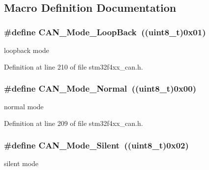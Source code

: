 \subsection{Macro Definition Documentation}
\hypertarget{group___c_a_n__operating__mode_gaad036c944403186eb3496ff65020c0ee}{
\subsubsection[{C\-A\-N\-\_\-\-Mode\-\_\-\-Loop\-Back}]{\setlength{\rightskip}{0pt plus 5cm}\#define C\-A\-N\-\_\-\-Mode\-\_\-\-Loop\-Back~((uint8\-\_\-t)0x01)}}\label{group___c_a_n__operating__mode_gaad036c944403186eb3496ff65020c0ee}
loopback mode 

Definition at line 210 of file stm32f4xx\-\_\-can.\-h.

\hypertarget{group___c_a_n__operating__mode_gaaf1f48ab4917ccfd5fd31dd781d59e29}{
\subsubsection[{C\-A\-N\-\_\-\-Mode\-\_\-\-Normal}]{\setlength{\rightskip}{0pt plus 5cm}\#define C\-A\-N\-\_\-\-Mode\-\_\-\-Normal~((uint8\-\_\-t)0x00)}}\label{group___c_a_n__operating__mode_gaaf1f48ab4917ccfd5fd31dd781d59e29}
normal mode 

Definition at line 209 of file stm32f4xx\-\_\-can.\-h.

\hypertarget{group___c_a_n__operating__mode_gac05e5d666f18eb35e8da70e6e17e8fb8}{
\subsubsection[{C\-A\-N\-\_\-\-Mode\-\_\-\-Silent}]{\setlength{\rightskip}{0pt plus 5cm}\#define C\-A\-N\-\_\-\-Mode\-\_\-\-Silent~((uint8\-\_\-t)0x02)}}\label{group___c_a_n__operating__mode_gac05e5d666f18eb35e8da70e6e17e8fb8}
silent mode 

